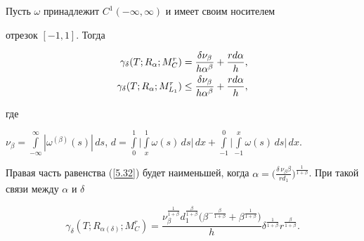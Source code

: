 \begin{thms}


Пусть $\omega$ принадлежит $C^1(-\infty,\infty)$ и имеет своим носителем


отрезок $[-1,1]$. Тогда


\begin{align}\label{5.32}


\gamma_\delta(T;R_\alpha;M^r_C)&=\frac{\delta


\nu_\beta}{h\alpha^\beta}+\frac{r d\alpha}{h},\\


\gamma_\delta(T;R_\alpha;M^r_{L_1})&\leq\frac{\delta


\nu_\beta}{h\alpha^\beta}+\frac{r d\alpha}{h},\notag


\end{align}


где


$\nu_\beta=\int\limits_{-\infty}^{\infty}|\omega^{(\beta)}


(s)|\,d s$, $d=\int\limits_0^1\Big|\int\limits_x^1


\omega(s)\,d s\Big|\,d


x+\int\limits_{-1}^0\Big|\int\limits_{-1}^x \omega(s)\,d


s\Big|\,d x$.


\end{thms}





Правая часть равенства (\ref{5.32}) будет наименьшей, когда $


\alpha=\big(\frac {\delta\,\nu_{\beta}\beta}{r d_{1}}\big


)^{\frac{1}{1+\beta}}$. При такой связи между $\alpha$ и $\delta$


$$


\gamma_\delta(T;R_{\alpha(\delta)};M^r_C)=


\frac{\nu_\beta^{\frac{1}{1+\beta}}d_1^{\frac{\beta}{1+\beta}}\big(


\beta^{-\frac{\beta}{1+\beta}}+\beta^{\frac{1}{1+\beta}}\big)}{h}


\delta^{\frac{1}{1+\beta}}r^{\frac{\beta}{1+\beta}}.


$$





